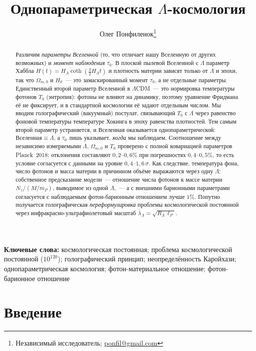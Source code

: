 \documentclass[12pt,a4paper]{article}
\title{\textbf{Однопараметрическая $\Lambda$-космология}}
\author{Олег Понфиленок\thanks{Независимый исследователь; \href{mailto:ponfil@gmail.com}{ponfil@gmail.com}}}
\date{}
\begin{document}
\pagecolor{black}
\color{white}

\maketitle

\begin{abstract}
Различим \emph{параметры Вселенной} (то, что отличает нашу Вселенную от других возможных) и \emph{момент наблюдения} $\tau_0$. В плоской пылевой Вселенной с $\Lambda$ параметр Хаббла $H(t)=H_\Lambda\coth(\tfrac32 H_\Lambda t)$ и плотность материи зависят только от $\Lambda$ и эпохи, так что $\Omega_{m,0}$ и $H_0$~--- это замаскированный момент $\tau_0$, а не отдельные параметры. Единственный второй параметр Вселенной в $\Lambda$CDM~--- это нормировка температуры фотонов $T_0$ (энтропия): фотоны не влияют на динамику, поэтому уравнение Фридмана её не фиксирует, и в стандартной космологии её задают отдельным числом. Мы вводим голографический (вакуумный) постулат, связывающий $T_0$ с $\Lambda$ через равенство фоновой температуры температуре Хокинга в эпоху равенства плотностей. Тем самым второй параметр устраняется, и Вселенная оказывается однопараметрической: $\text{Вселенная}\equiv\Lambda$, а $\tau_0$ лишь указывает, \emph{когда} мы наблюдаем. Соотношение между независимо измеряемыми $\Lambda$, $\Omega_{m,0}$ и $T_0$ проверено с полной ковариацией параметров Planck~2018: отклонения составляют $0{,}2$--$0{,}6\%$ при погрешностях $0{,}4$--$0{,}5\%$, то есть условие согласуется с данными на уровне $0{,}4$--$1{,}6\,\sigma$. Как следствие, температура фона, число фотонов и масса материи в причинном объёме выражаются через одну $\Lambda$; собственное предсказание модели~--- отношение числа фотонов к массе материи $N_\gamma/(M/m_P)$, выводимое из одной $\Lambda$,~--- а с внешними барионными параметрами согласуется с наблюдаемым фотон-барионным отношением лучше $1\%$. Попутно получается голографическая \emph{переформулировка} проблемы космологической постоянной через инфракрасно-ультрафиолетовый масштаб $\bar\lambda_\Lambda=\sqrt{R_\Lambda\,\ell_P}$.
\end{abstract}

\noindent\textbf{Ключевые слова:} космологическая постоянная; проблема космологической постоянной ($10^{120}$); голографический принцип; неопределённость Каройхази; однопараметрическая космология; фотон-материальное отношение; фотон-барионное отношение

\section{Введение}
\end{document}
